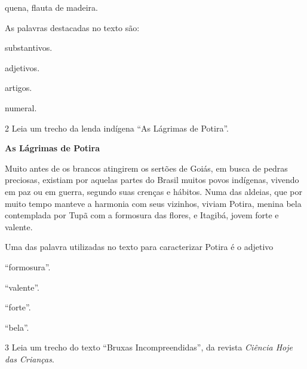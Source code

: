 \begin{conteudo}
\begin{conteudo}
\begin{conteudo}
\begin{conteudo}
\begin{conteudo}
\begin{myquote}
\begin{small}
 quena, flauta de madeira.
\end{small}
\end{myquote}

As palavras destacadas no texto são:

\begin{escolha}
\item substantivos.

\item adjetivos.

\item artigos.

\item numeral.
\end{escolha}

\num{2} Leia um trecho da lenda indígena ``As Lágrimas de Potira''.

\begin{myquote}
\textbf{As Lágrimas de Potira}

Muito antes de os brancos atingirem os sertões de Goiás, em busca de
pedras preciosas, existiam por aquelas partes do Brasil muitos povos
indígenas, vivendo em paz ou em guerra, segundo suas crenças e hábitos.
Numa das aldeias, que por muito tempo manteve a harmonia com seus
vizinhos, viviam Potira, menina bela contemplada por Tupã com a formosura das
flores, e Itagibá, jovem forte e valente. 

\end{myquote}

Uma das palavra utilizadas no texto para caracterizar Potira é o adjetivo

\begin{escolha}
\item ``formosura''.

\item ``valente''.

\item ``forte''.

\item ``bela''.
\end{escolha}

\pagebreak
\num{3} Leia um trecho do texto ``Bruxas Incompreendidas'',
da revista \textit{Ciência Hoje das Crianças}.


\end{conteudo}
\end{conteudo}
\end{conteudo}
\end{conteudo}
\end{conteudo}
